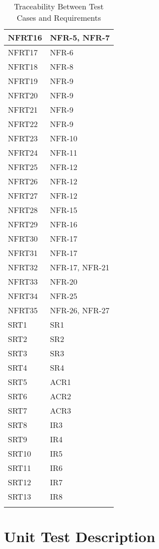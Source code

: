 \documentclass[12pt, titlepage]{article}
\begin{document}
\begin{longtable}{| p{} | p{} |}
  NFRT16 &  NFR-5, NFR-7  \\ \hline
  NFRT17 &  NFR-6  \\ \hline
  NFRT18 &  NFR-8  \\ \hline
  NFRT19 &   NFR-9 \\ \hline
  NFRT20 &  NFR-9  \\ \hline
  NFRT21 &  NFR-9  \\ \hline
  NFRT22&  NFR-9  \\ \hline
  NFRT23 &  NFR-10  \\ \hline
  NFRT24 &  NFR-11  \\ \hline
  NFRT25 &  NFR-12  \\ \hline
  NFRT26 &  NFR-12  \\ \hline
  NFRT27 &  NFR-12  \\ \hline
  NFRT28 &  NFR-15 \\ \hline
  NFRT29 &   NFR-16 \\ \hline
  NFRT30 &  NFR-17  \\ \hline
  NFRT31 &   NFR-17 \\ \hline
  NFRT32 &  NFR-17, NFR-21 \\ \hline
  NFRT33 &  NFR-20  \\ \hline
  NFRT34 &  NFR-25  \\ \hline
  NFRT35 &   NFR-26, NFR-27 \\ \hline
  SRT1 & SR1 \\ \hline
  SRT2 & SR2 \\ \hline
  SRT3 & SR3 \\ \hline
  SRT4 & SR4 \\ \hline
  SRT5 & ACR1 \\ \hline
  SRT6 & ACR2 \\ \hline
  SRT7 & ACR3 \\ \hline
  SRT8 & IR3 \\ \hline
  SRT9 & IR4 \\ \hline
  SRT10 & IR5 \\ \hline
  SRT11 & IR6 \\ \hline
  SRT12 & IR7 \\ \hline
  SRT13 & IR8 \\ \hline

  \caption{Traceability Between Test Cases and Requirements} %
  \label{tab:myfirstlongtable}
  \end{longtable}
\section{Unit Test Description}
\end{document}
